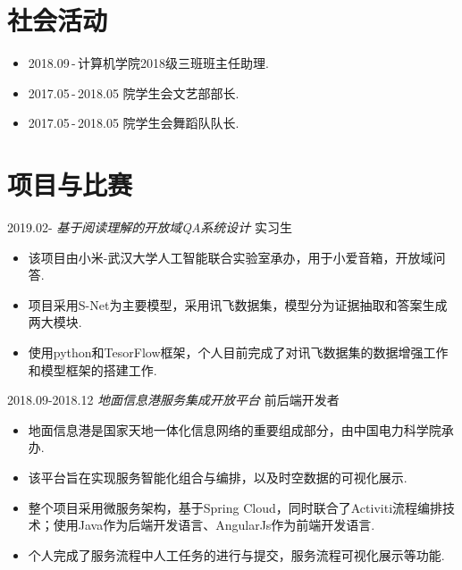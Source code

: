 \documentclass[letterpaper,AutoFakeBold]{twentysecondcv} %
\begin{document}
\newpage %
\makeprofile %




\section{\large 社会活动}


\begin{itemize}
	\setlength{\itemsep}{0pt}
	\setlength{\parsep}{0pt}
	\setlength{\parskip}{0pt}
	\item 2018.09\,-\,\qquad\qquad\quad 计算机学院2018级三班班主任助理.
	\item 2017.05\,-\,2018.05 \qquad 院学生会文艺部部长.
	\item 2017.05\,-\,2018.05 \qquad 院学生会舞蹈队队长.
\end{itemize}


\section{\large 项目与比赛}

2019.02- \qquad \qquad \quad \emph{ 基于阅读理解的开放域QA系统设计 } \hfill 实习生
\begin{itemize}
	\setlength{\itemsep}{0pt}
	\setlength{\parsep}{0pt}
	\setlength{\parskip}{0pt}
	\item 
	该项目由小米-武汉大学人工智能联合实验室承办，用于小爱音箱，开放域问答.
	\item
	项目采用S-Net为主要模型，采用讯飞数据集，模型分为证据抽取和答案生成两大模块.
	\item 
	使用python和TesorFlow框架，个人目前完成了对讯飞数据集的数据增强工作和模型框架的搭建工作.
\end{itemize}

2018.09-2018.12 \qquad \emph{ 地面信息港服务集成开放平台 } \hfill 前后端开发者
\begin{itemize}
	\setlength{\itemsep}{0pt}
	\setlength{\parsep}{0pt}
	\setlength{\parskip}{0pt}
	\item 
	地面信息港是国家天地一体化信息网络的重要组成部分，由中国电力科学院承办.
	\item
	该平台旨在实现服务智能化组合与编排，以及时空数据的可视化展示.
	\item 
	整个项目采用微服务架构，基于Spring Cloud，同时联合了Activiti流程编排技术；使用Java作为后端开发语言、AngularJs作为前端开发语言.
	\item 
	个人完成了服务流程中人工任务的进行与提交，服务流程可视化展示等功能.
\end{itemize}
\end{document}
